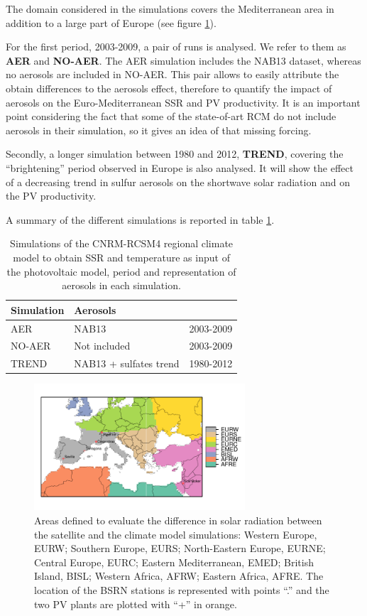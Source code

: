The domain considered in the simulations covers the Mediterranean area in addition to a large part of Europe (see figure \ref{fig:mapapral}).

For the first period, 2003-2009, a pair of runs is analysed. We refer to them as \textbf{AER} and \textbf{NO-AER}. The AER simulation includes the NAB13 dataset, whereas no aerosols are included in NO-AER. This pair allows to easily attribute the obtain differences to the aerosols effect, therefore to quantify the impact of aerosols on the Euro-Mediterranean SSR and PV productivity. It is an important point considering the fact that some of the state-of-art RCM do not include aerosols in their simulation, so it gives an idea of that missing forcing.

Secondly, a longer simulation between 1980 and 2012, \textbf{TREND}, covering the ``brightening'' period observed in Europe is also analysed. It will show the effect of a decreasing trend in sulfur aerosols on the shortwave solar radiation and on the PV productivity.  

A summary of the different simulations is reported in table \ref{tabSIM}.

\begin{table}
  \begin{tabular}{>{\raggedright}m{2cm}>{\raggedright}m{3cm}>{\raggedright}m{2cm}}
    \toprule 
    Simulation & Aerosols & \centering{Period}\tabularnewline
    \midrule
    AER & NAB13 & 2003-2009
    \tabularnewline
    \midrule
    NO-AER & Not included & 2003-2009
   \tabularnewline
   \midrule           
  TREND & NAB13 + sulfates trend & 1980-2012
   \tabularnewline
    \bottomrule
  \end{tabular}
  \caption{Simulations of the CNRM-RCSM4 regional climate model to obtain SSR and temperature as input of the photovoltaic model, period and representation of aerosols in each simulation.}
\label{tabSIM}
\end{table}

\begin{figure}[h!]
\centering\includegraphics[width=0.7\textwidth]{figs/capitulo6/zonasPuntosLabel.pdf}
\caption{Areas defined to evaluate the difference in solar radiation between the satellite and the climate model simulations: Western Europe, EURW; Southern Europe, EURS; North-Eastern Europe, EURNE; Central Europe, EURC; Eastern Mediterranean, EMED; British Island, BISL; Western Africa, AFRW; Eastern Africa, AFRE. The location of the BSRN stations is represented with points ``.'' and the two PV plants are plotted with ``+'' in orange.}
\label{fig:mapapral}
\end{figure}

